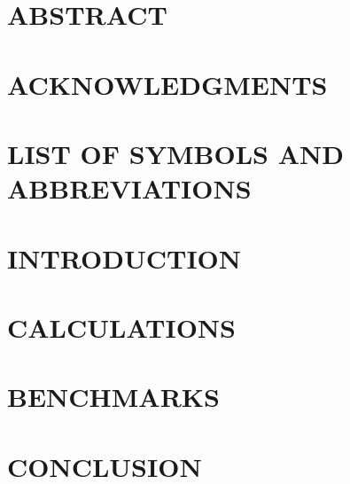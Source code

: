 \documentclass[12pt,oneside,letterpaper,chapterprefix=on,numbers=noenddot]{scrbook}
\begin{document}
\setlength{\belowcaptionskip}{-1.75\baselineskip}
\setlength{\intextsep}{8pt}

\renewcommand{\contentsname}{TABLE OF CONTENTS}

\frontmatter
	


\setcounter{page}{2} %

\chapter{ABSTRACT}\label{ch:abstr}


\chapter{ACKNOWLEDGMENTS}\label{ch:ackn}


\clearpage
\tableofcontents


\clearpage
\renewcommand{\cftfigaftersnum}{.}
\setlength\cftbeforefigskip{\baselineskip}
\listoffigures
{}

\chapter{LIST OF SYMBOLS AND ABBREVIATIONS}\label{ch:symb}

 
\mainmatter

\chapter{INTRODUCTION}\label{ch:1}


\chapter{CALCULATIONS}\label{ch:2}


\chapter{BENCHMARKS}\label{ch:3}


\chapter{CONCLUSION}\label{ch:conclusion}

\end{document}
